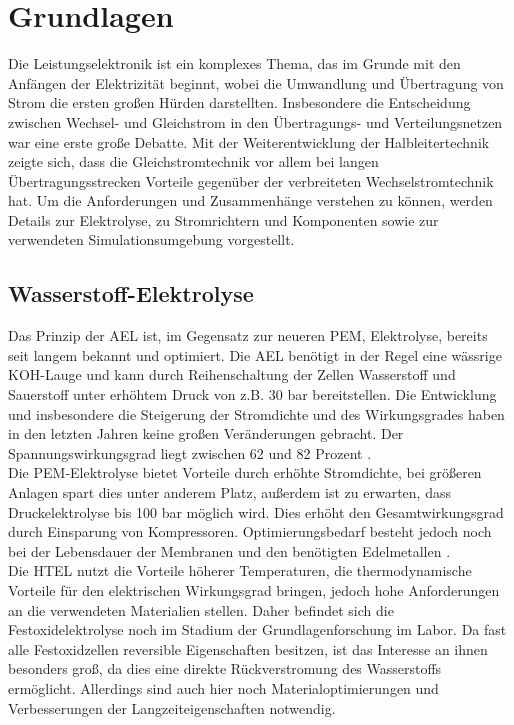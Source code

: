 \chapter{Grundlagen}
\label{sec:Grundlagen}
Die Leistungselektronik ist ein komplexes Thema, das im Grunde mit den Anfängen der Elektrizität beginnt, wobei die Umwandlung und Übertragung von Strom die ersten großen Hürden darstellten. Insbesondere die Entscheidung zwischen Wechsel- und Gleichstrom in den Übertragungs- und Verteilungsnetzen war eine erste große Debatte. Mit der Weiterentwicklung der Halbleitertechnik zeigte sich, dass die Gleichstromtechnik vor allem bei langen Übertragungsstrecken Vorteile gegenüber der verbreiteten Wechselstromtechnik hat. Um die Anforderungen und Zusammenhänge verstehen zu können, werden Details zur Elektrolyse, zu Stromrichtern und Komponenten sowie zur verwendeten Simulationsumgebung vorgestellt.

\section{Wasserstoff-Elektrolyse}
\label{sec:Elektrolyse}
Das Prinzip der \gls{AEL} ist, im Gegensatz zur neueren \gls{PEM}, Elektrolyse, bereits seit langem bekannt und optimiert. Die \gls{AEL} benötigt in der Regel eine wässrige KOH-Lauge und kann durch Reihenschaltung der Zellen Wasserstoff und Sauerstoff unter erhöhtem Druck von z.B. 30 bar bereitstellen. Die Entwicklung und insbesondere die Steigerung der Stromdichte und des Wirkungsgrades haben in den letzten Jahren keine großen Veränderungen gebracht. Der Spannungswirkungsgrad liegt zwischen 62 und 82 Prozent \cite{NOWH2}.\\
Die \gls{PEM}-Elektrolyse bietet Vorteile durch erhöhte Stromdichte, bei größeren Anlagen spart dies unter anderem Platz, außerdem ist zu erwarten, dass Druckelektrolyse bis 100 bar möglich wird.  Dies erhöht den Gesamtwirkungsgrad durch Einsparung von Kompressoren. Optimierungsbedarf besteht jedoch noch bei der Lebensdauer der Membranen und den benötigten Edelmetallen \cite{NOWH2}. \\
Die \gls{HTEL} nutzt die Vorteile höherer Temperaturen, die thermodynamische Vorteile für den elektrischen Wirkungsgrad bringen, jedoch hohe Anforderungen an die verwendeten Materialien stellen. Daher befindet sich die Festoxidelektrolyse noch im Stadium der Grundlagenforschung im Labor. Da fast alle Festoxidzellen reversible Eigenschaften besitzen, ist das Interesse an ihnen besonders groß, da dies eine direkte Rückverstromung des Wasserstoffs ermöglicht. Allerdings sind auch hier noch Materialoptimierungen und Verbesserungen der Langzeiteigenschaften notwendig.\\

